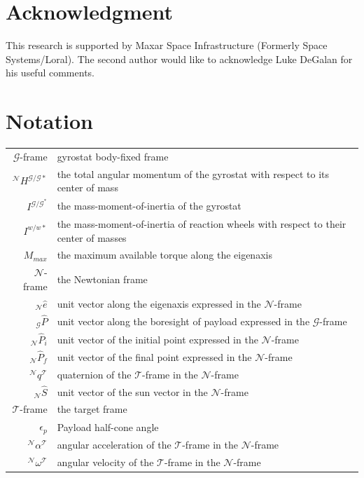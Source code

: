 \documentclass[letterpaper, paper,12pt]{AAS}		%
\begin{document}
	\section{Acknowledgment}
	This research is supported by Maxar Space Infrastructure (Formerly Space Systems/Loral). The second author would like to acknowledge Luke DeGalan for his useful comments.
	\section{Notation}
	
	\begin{supertabular}{rl}
		$\mathcal{G}$-frame& gyrostat body-fixed frame \\
		$^\mathcal{N}H^{\mathcal{G/G*}}$ & the total angular momentum of the gyrostat with respect to its center of mass \\
		$I^{\mathcal{G/G^*}}$ &the mass-moment-of-inertia of the gyrostat\\
		$I^{w/w*}$ & the mass-moment-of-inertia of reaction wheels with respect to their center of masses\\
		$M_{max}$ & the maximum available torque along the eigenaxis\\
		$\mathcal{N}$-frame & the Newtonian frame \\
		
		$_\mathcal{N}\hat{e}$ & unit vector along the eigenaxis expressed in the $\mathcal{N}$-frame\\
		$_\mathcal{G}\hat{P}$ & unit vector along the boresight of payload expressed in the $\mathcal{G}$-frame\\
		$_\mathcal{N}\hat{P}_i$ & unit vector of the initial point expressed in the $\mathcal{N}$-frame\\
		$_\mathcal{N}\hat{P}_f$ & unit vector of the final point expressed in the $\mathcal{N}$-frame\\
		
		$^\mathcal{N}q^\mathcal{T}$& quaternion of the $\mathcal{T}$-frame in the $\mathcal{N}$-frame\\
		$_\mathcal{N}\hat{S}$ & unit vector of the sun vector in the $\mathcal{N}$-frame\\
		$\mathcal{T}$-frame & the target frame \\
		$\epsilon_p$ & Payload half-cone angle\\
		$^\mathcal{N}\alpha^\mathcal{T}$& angular acceleration of the $\mathcal{T}$-frame in the $\mathcal{N}$-frame\\
		$^\mathcal{N}\omega^\mathcal{T}$& angular velocity of the $\mathcal{T}$-frame in the $\mathcal{N}$-frame\\
	\end{supertabular}

	
	
	
	
\end{document}
